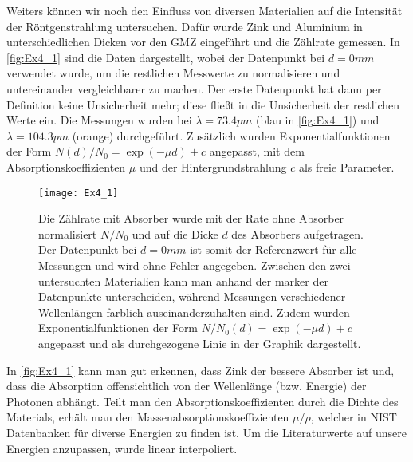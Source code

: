 Weiters können wir noch den Einfluss von diversen Materialien auf die Intensität der Röntgenstrahlung untersuchen. Dafür wurde Zink und Aluminium in unterschiedlichen Dicken vor den GMZ eingeführt und die Zählrate gemessen. In \autoref{fig:Ex4_1} sind die Daten dargestellt, wobei der Datenpunkt bei \( d = 0 \unit{mm} \) verwendet wurde, um die restlichen Messwerte zu normalisieren und untereinander vergleichbarer zu machen. Der erste Datenpunkt hat dann per Definition keine Unsicherheit mehr; diese fließt in die Unsicherheit der restlichen Werte ein. Die Messungen wurden bei \( \lambda = 73.4 \unit{pm} \) (blau in \autoref{fig:Ex4_1}) und \( \lambda = 104.3 \unit{pm} \) (orange) durchgeführt. Zusätzlich wurden Exponentialfunktionen der Form \( N(d)/N_0 = \exp(-\mu d) + c \) angepasst, mit dem Absorptionskoeffizienten \( \mu \) und der Hintergrundstrahlung \( c \) als freie Parameter.

\begin{figure}[H]
	\centering
	\texttt{[image: Ex4\_1]}
	\caption{Die Zählrate mit Absorber wurde mit der Rate ohne Absorber normalisiert \( N/N_0 \) und auf die Dicke \( d \) des Absorbers aufgetragen. Der Datenpunkt bei \( d = 0 \unit{mm} \) ist somit der Referenzwert für alle Messungen und wird ohne Fehler angegeben. Zwischen den zwei untersuchten Materialien kann man anhand der marker der Datenpunkte unterscheiden, während Messungen verschiedener Wellenlängen farblich auseinanderzuhalten sind. Zudem wurden Exponentialfunktionen der Form \( N/N_0(d) = \exp(-\mu d)+c \) angepasst und als durchgezogene Linie in der Graphik dargestellt.}
	\label{fig:Ex4_1}
\end{figure}

In \autoref{fig:Ex4_1} kann man gut erkennen, dass Zink der bessere Absorber ist und, dass die Absorption offensichtlich von der Wellenlänge (bzw. Energie) der Photonen abhängt. Teilt man den Absorptionskoeffizienten durch die Dichte des Materials, erhält man den Massenabsorptionskoeffizienten \( \mu/\rho \), welcher in NIST Datenbanken \autocite{nist_Daten} für diverse Energien zu finden ist. Um die Literaturwerte auf unsere Energien anzupassen, wurde linear interpoliert.

